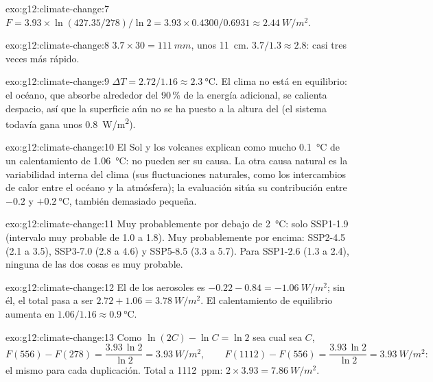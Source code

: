 \begin{solution}{exo:g12:climate-change:7}
$F = 3.93 \times \ln(427.35/278)/\ln 2 = 3.93 \times 0.4300/0.6931 \approx
\qty{2.44}{W/m^2}$.
\end{solution}

\begin{solution}{exo:g12:climate-change:8}
$3.7 \times 30 = \qty{111}{mm}$, unos \qty{11}{cm}. $3.7/1.3 \approx 2.8$:
casi tres veces más rápido.
\end{solution}

\begin{solution}{exo:g12:climate-change:9}
$\Delta T = 2.72/1.16 \approx \qty{2.3}{\degreeCelsius}$. El clima no está
en equilibrio: el océano, que absorbe alrededor del 90\,\% de la energía adicional,
se calienta despacio, así que la superficie aún no se ha puesto a la altura del  (el
sistema todavía gana unos \qty{0.8}{W/m^2}).
\end{solution}

\begin{solution}{exo:g12:climate-change:10}
El Sol y los volcanes explican como mucho \qty{0.1}{\degreeCelsius} de un
calentamiento de \qty{1.06}{\degreeCelsius}: no pueden ser su causa. La otra
causa natural es la variabilidad interna del clima (sus fluctuaciones
naturales, como los intercambios de calor entre el océano y la atmósfera); la
evaluación sitúa su contribución entre $-0.2$ y $+\qty{0.2}{\degreeCelsius}$,
también demasiado pequeña.
\end{solution}

\begin{solution}{exo:g12:climate-change:11}
Muy probablemente por debajo de \qty{2}{\degreeCelsius}: solo SSP1-1.9 (intervalo muy probable
de 1.0 a 1.8). Muy probablemente por encima: SSP2-4.5 (2.1 a 3.5), SSP3-7.0 (2.8 a 4.6)
y SSP5-8.5 (3.3 a 5.7). Para SSP1-2.6 (1.3 a 2.4), ninguna de las dos cosas es muy probable.
\end{solution}

\begin{solution}{exo:g12:climate-change:12}
El  de los aerosoles es $-0.22 - 0.84 = \qty{-1.06}{W/m^2}$; sin él, el
total pasa a ser $2.72 + 1.06 = \qty{3.78}{W/m^2}$. El calentamiento de equilibrio
aumenta en $1.06/1.16 \approx \qty{0.9}{\degreeCelsius}$.
\end{solution}

\begin{solution}{exo:g12:climate-change:13}
Como $\ln(2C) - \ln C = \ln 2$ sea cual sea $C$,
\[
  F(556) - F(278) = \frac{3.93\,\ln 2}{\ln 2} = \qty{3.93}{W/m^2}, \qquad
  F(1112) - F(556) = \frac{3.93\,\ln 2}{\ln 2} = \qty{3.93}{W/m^2}:
\]
el mismo  para cada duplicación. Total a \qty{1112}{ppm}: $2 \times 3.93 =
\qty{7.86}{W/m^2}$.
\end{solution}

